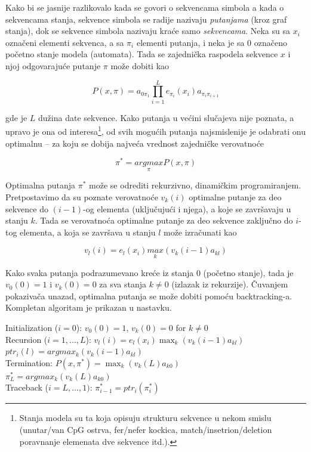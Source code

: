 \documentclass[a4paper, 12pt]{article}
\begin{document}
\noindent Kako bi se jasnije razlikovalo kada se govori o sekvencama simbola a kada o sekvencama stanja, sekvence simbola se radije nazivaju \textit{putanjama} (kroz graf stanja), dok se sekvence simbola nazivaju kraće samo \textit{sekvencama}. Neka su sa $x_i$ označeni elementi sekvenca, a sa $\pi_i$ elementi putanja, i neka je sa $0$ označeno početno stanje modela (automata). Tada se zajednička raspodela sekvence $x$ i njoj odgovarajuće putanje $\pi$ može dobiti kao

$$P(x, \pi) = a_{0\pi_1}\prod_{i=1}^{L} e_{\pi_i}(x_i) a_{\pi_i\pi_{i+1}}$$ 

\noindent gde je $L$ dužina date sekvence. Kako putanja u većini slučajeva nije poznata, a upravo je ona od interesa\footnote{Stanja modela su ta koja opisuju strukturu sekvence u nekom smislu (unutar/van CpG ostrva, fer/nefer kockica, match/insetrion/deletion poravnanje elemenata dve sekvence itd.).}, od svih mogućih putanja najsmislenije je odabrati onu optimalnu -- za koju se dobija najveća vrednost zajedničke verovatnoće 

$$\pi^* = \underset{\pi}{argmax} P(x, \pi)$$

\noindent Optimalna putanja $\pi^*$ može se odrediti rekurzivno, dinamičkim programiranjem. Pretpostavimo da su poznate verovatnoće $v_k(i)$ optimalne putanje za deo sekvence do $(i-1)$-og elementa (uključujući i njega), a koje se završavaju u stanju $k$. Tada se verovatnoća optimalne putanje za deo sekvence zaključno do $i$-tog elementa, a koja se završava u stanju $l$ može izračunati kao

$$v_l(i) = e_l(x_i)\underset{k}{max}(v_k(i-1)a_{kl})$$   

\noindent Kako svaka putanja podrazumevano kreće iz stanja $0$ (početno stanje), tada je $v_0(0) = 1$ i $v_k(0) = 0$ za sva stanja $k \neq 0$ (izlazak iz rekurzije). Čuvanjem pokazivača unazad, optimalna putanja se može dobiti pomoću backtracking-a. Kompletan algoritam je prikazan u nastavku.

\begin{algorithm}[h!] 
 \vspace*{0.2cm}
 Initialization ($i=0$): \hspace{0.3cm} $v_0(0) = 1$, $v_k(0) = 0$ for $k \neq 0$ \\
 \vspace*{0.2cm}
 Recursion ($i=1, ..., L$): \hspace{0.05cm}$v_l(i) = e_l(x_i)\max_k(v_k(i-1)a_{kl})$ \\
 \hspace*{4.25cm} $ptr_i(l) = argmax_k (v_k(i-1)a_{kl})$ \\
 \vspace*{0.2cm}
 Termination: \hspace{1.8cm} $P(x, \pi^*) = \max_k (v_k(L)a_{k0})$ \\
 \hspace*{4.25cm} $\pi_L^* = argmax_k(v_k(L)a_{k0})$ \\
 \vspace*{0.2cm}
 Traceback ($i=L, ..., 1)$: \hspace{0.05cm}$\pi_{i-1}^* = ptr_i(\pi_i^*)$           
\end{algorithm}
\end{document}
